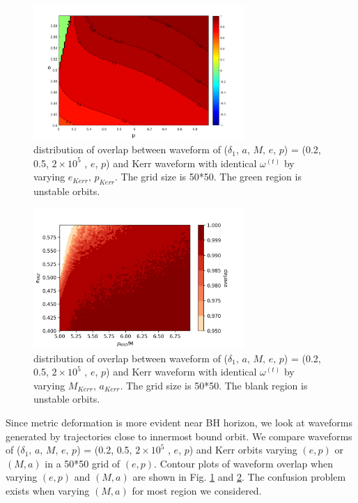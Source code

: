 \documentclass{article}
\begin{document}
	\begin{figure}[!htb]
	\centering
	\includegraphics[width=8cm]{ep_best_dist.png}
	
	\caption{distribution of overlap between waveform of ($\delta_1,\, a,\, M,\, e,\, p$) = (0.2, 0.5, $2 \times 10^5 $ , $e$, $p$) and Kerr waveform with identical $\omega^{(t)}$ by varying $e_{Kerr},\, p_{Kerr}$. The grid size is 50*50. The green region is unstable orbits.}
	\label{epdist}
\end{figure}	

	\begin{figure}[!htb]
	\centering
	\includegraphics[width=8cm]{FF_am.png}
	
	\caption{distribution of overlap between waveform of ($\delta_1,\, a,\, M,\, e,\, p$) = (0.2, 0.5, $2 \times 10^5 $ , $e$, $p$) and Kerr waveform with identical $\omega^{(t)}$ by varying $M_{Kerr},\, a_{Kerr}$. The grid size is 50*50. The blank region is unstable orbits.}
	\label{amdist}
\end{figure}	

Since metric deformation is more evident near BH horizon, we look at waveforms generated by trajectories close to innermost bound orbit. We compare waveforms of ($\delta_1,\, a,\, M,\, e,\, p$) = (0.2, 0.5, $2 \times 10^5 $ , $e$, $p$) and Kerr orbits varying $(e,p)$ or $(M,a)$ in a 50*50 grid of $(e,p)$. Contour plots of waveform overlap when varying $(e,p)$ and $(M,a)$ are shown in Fig. \ref{epdist} and \ref{amdist}. The confusion problem exists when varying $(M,a)$ for most region we considered. 
\end{document}

